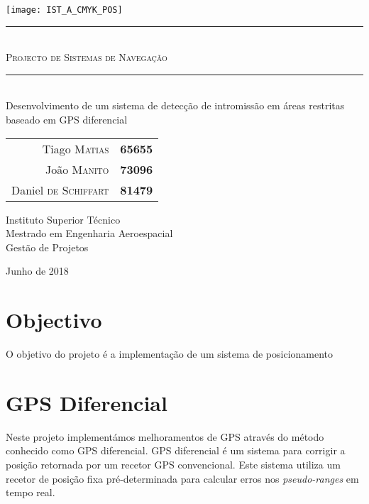 \documentclass{article}
\begin{document}
\thispagestyle{empty}

\texttt{[image: IST\_A\_CMYK\_POS]}
	
\begin{center}
	\vspace{70mm} %
	\rule{\linewidth}{0.5pt} \\
    \vspace{2mm}
	\Huge \textsc{Projecto de Sistemas de Navegação} \\
	\rule{\linewidth}{2pt} \\
	\vspace{8mm} %
	\LARGE Desenvolvimento de um sistema de detecção de intromissão em áreas restritas baseado em GPS diferencial
	
	\vspace{\fill} %
	\large
	
	\begin{tabular}{r l}
		Tiago \textsc{Matias} & \textbf{65655} \\
		João \textsc{Manito} & \textbf{73096} \\
		Daniel \textsc{de Schiffart} & \textbf{81479}
	\end{tabular}
	
	\vspace{10mm} %
	\Large Instituto Superior Técnico \\
	Mestrado em Engenharia Aeroespacial \\
	\vspace{1mm}
	\large Gestão de Projetos
	
	\vspace{10mm} %
	\Large Junho de 2018
\end{center}

\newpage

\section{Objectivo}

O objetivo do projeto é a implementação de um sistema de
posicionamento

\section{GPS Diferencial}

Neste projeto implementámos melhoramentos de GPS através do método
conhecido como GPS diferencial. GPS diferencial é um sistema para
corrigir a posição retornada por um recetor GPS convencional. Este
sistema utiliza um recetor de posição fixa pré-determinada para
calcular erros nos \textit{pseudo-ranges} em tempo real.
\end{document}
